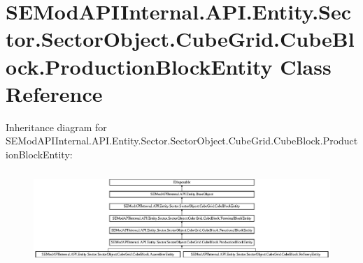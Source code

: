 \hypertarget{class_s_e_mod_a_p_i_internal_1_1_a_p_i_1_1_entity_1_1_sector_1_1_sector_object_1_1_cube_grid_1_1ad6cba65b35b2f15d0fc9a7c92190a4b}{}\section{S\+E\+Mod\+A\+P\+I\+Internal.\+A\+P\+I.\+Entity.\+Sector.\+Sector\+Object.\+Cube\+Grid.\+Cube\+Block.\+Production\+Block\+Entity Class Reference}
\label{class_s_e_mod_a_p_i_internal_1_1_a_p_i_1_1_entity_1_1_sector_1_1_sector_object_1_1_cube_grid_1_1ad6cba65b35b2f15d0fc9a7c92190a4b}
Inheritance diagram for S\+E\+Mod\+A\+P\+I\+Internal.\+A\+P\+I.\+Entity.\+Sector.\+Sector\+Object.\+Cube\+Grid.\+Cube\+Block.\+Production\+Block\+Entity\+:\begin{figure}[H]
\begin{center}
\leavevmode
\includegraphics[height=3.557169cm]{class_s_e_mod_a_p_i_internal_1_1_a_p_i_1_1_entity_1_1_sector_1_1_sector_object_1_1_cube_grid_1_1ad6cba65b35b2f15d0fc9a7c92190a4b}
\end{center}
\end{figure}
